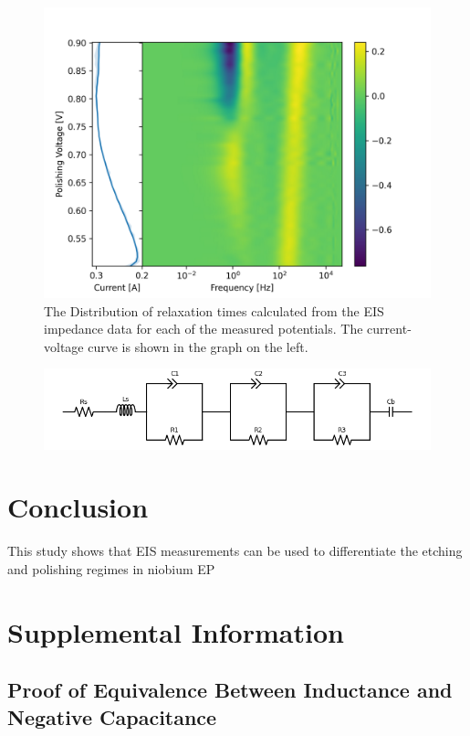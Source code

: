 \documentclass[11pt]{article}
\begin{document}
\begin{figure}
  \label{fig:gamma}
  \includegraphics[]{figures/gamma.png}  
  \caption{The Distribution of relaxation times calculated from the EIS impedance data for each of the measured potentials. The current-voltage curve is shown in the graph on the left.}
\end{figure}

\begin{figure}
  \label{fig:ec}
  \includegraphics[]{figures/ec.png}
  \caption{}
\end{figure}




\section{Conclusion}
\label{sec:org57282ed}
This study shows that EIS measurements can be used to differentiate the etching and polishing regimes in niobium EP


\section{Supplemental Information}
\label{sec:org60214d3}


\subsection{Proof of Equivalence Between Inductance and Negative Capacitance}
\end{document}
